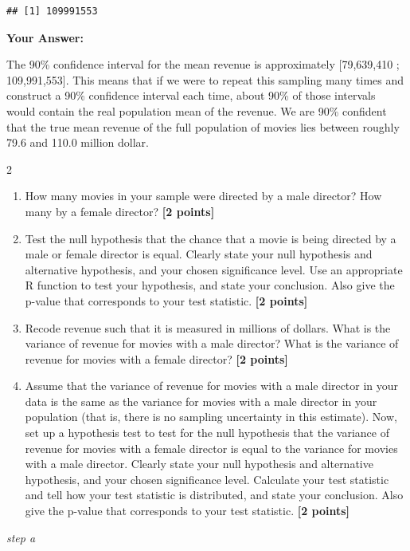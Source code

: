 \documentclass[
]{article}
\providecommand{\tightlist}{%
  \setlength{\itemsep}{0pt}\setlength{\parskip}{0pt}}
\begin{document}
\begin{verbatim}
## [1] 109991553
\end{verbatim}

\textbf{Your Answer:}

The 90\% confidence interval for the mean revenue is approximately
{[}79,639,410 ; 109,991,553{]}. This means that if we were to repeat
this sampling many times and construct a 90\% confidence interval each
time, about 90\% of those intervals would contain the real population
mean of the revenue. We are 90\% confident that the true mean revenue of
the full population of movies lies between roughly 79.6 and 110.0
million dollar.

2

\begin{enumerate}
\def\labelenumi{\alph{enumi}.}
\tightlist
\item
  How many movies in your sample were directed by a male director? How
  many by a female director? \textbf{[2 points]}
\item
  Test the null hypothesis that the chance that a movie is being
  directed by a male or female director is equal. Clearly state your
  null hypothesis and alternative hypothesis, and your chosen
  significance level. Use an appropriate R function to test your
  hypothesis, and state your conclusion. Also give the p-value that
  corresponds to your test statistic. \textbf{[2 points]}
\item
  Recode revenue such that it is measured in millions of dollars. What
  is the variance of revenue for movies with a male director? What is
  the variance of revenue for movies with a female director?
  \textbf{[2 points]}
\item
  Assume that the variance of revenue for movies with a male director in
  your data is the same as the variance for movies with a male director
  in your population (that is, there is no sampling uncertainty in this
  estimate). Now, set up a hypothesis test to test for the null
  hypothesis that the variance of revenue for movies with a female
  director is equal to the variance for movies with a male director.
  Clearly state your null hypothesis and alternative hypothesis, and
  your chosen significance level. Calculate your test statistic and tell
  how your test statistic is distributed, and state your conclusion.
  Also give the p-value that corresponds to your test statistic.
  \textbf{[2 points]}
\end{enumerate}

\emph{step a}
\end{document}

